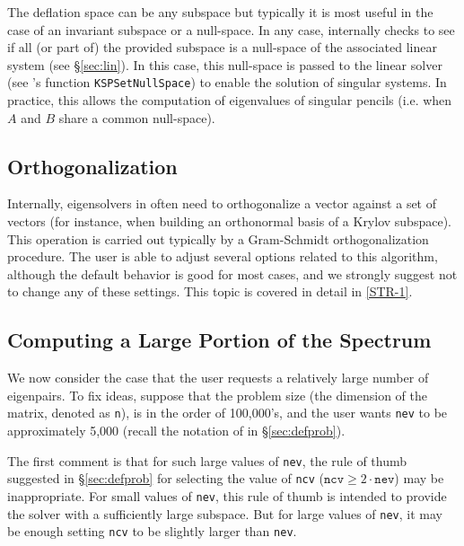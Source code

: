 	The deflation space can be any subspace but typically it is most useful in the case of an invariant subspace or a null-space. In any case, \slepc internally checks to see if all (or part of) the provided subspace is a null-space of the associated linear system (see \S\ref{sec:lin}). In this case, this null-space is passed to the linear solver (see \petsc's function \texttt{KSPSetNullSpace}) to enable the solution of singular systems. In practice, this allows the computation of eigenvalues of singular pencils (i.e. when $A$ and $B$ share a common null-space).

\subsection{Orthogonalization}
\label{sec:orthog}

	Internally, eigensolvers in  often need to orthogonalize a vector against a set of vectors (for instance, when building an orthonormal basis of a Krylov subspace). This operation is carried out typically by a Gram-Schmidt orthogonalization procedure. The user is able to adjust several options related to this algorithm, although the default behavior is good for most cases, and we strongly suggest not to change any of these settings. This topic is covered in detail in \hyperlink{str}{[STR-1]}.

\subsection{Computing a Large Portion of the Spectrum}
\label{sec:large-nev}

We now consider the case that the user requests a relatively large number of eigenpairs. To fix ideas, suppose that the problem size (the dimension of the matrix, denoted as \texttt{n}), is in the order of 100,000's, and the user wants \texttt{nev} to be approximately 5,000 (recall the notation of  in \S\ref{sec:defprob}).

The first comment is that for such large values of \texttt{nev}, the rule of thumb suggested in \S\ref{sec:defprob} for selecting the value of \texttt{ncv} ($\mathtt{ncv}\geq2\cdot\mathtt{nev}$) may be inappropriate. For small values of \texttt{nev}, this rule of thumb is intended to provide the solver with a sufficiently large subspace. But for large values of \texttt{nev}, it may be enough setting \texttt{ncv} to be slightly larger than \texttt{nev}.

